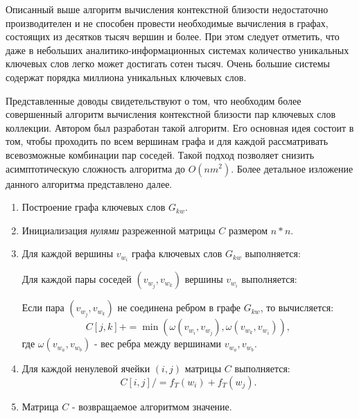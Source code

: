 Описанный выше алгоритм вычисления контекстной близости недостаточно производителен и не способен провести необходимые вычисления в графах, состоящих из десятков тысяч вершин и более. При этом следует отметить, что даже в небольших аналитико-информационных системах количество уникальных ключевых слов легко может достигать сотен тысяч. Очень большие системы содержат порядка миллиона уникальных ключевых слов.

Представленные доводы свидетельствуют о том, что необходим более совершенный алгоритм вычисления контекстной близости пар ключевых слов коллекции. Автором был разработан такой алгоритм. Его основная идея состоит в том, чтобы проходить по всем вершинам графа и для каждой рассматривать всевозможные комбинации пар соседей. Такой подход позволяет снизить асимптотическую сложность алгоритма до $O(nm^2)$. Более детальное изложение данного алгоритма представлено далее.

\begin{enumerate}
    \item Построение графа ключевых слов $G_{kw}$.
    \item Инициализация \emph{нулями} разреженной матрицы $C$ размером $n * n$.
    \item Для каждой вершины $v_{w_i}$ графа ключевых слов $G_{kw}$ выполняется:

        \hspace{15pt} Для каждой пары соседей $(v_{w_j}, v_{w_k})$ вершины $v_{w_i}$ выполняется:

                \hspace{30pt} Если пара $(v_{w_j}, v_{w_k})$ не соединена ребром в графе $G_{kw}$, то вычисляется:
                $$ C[j, k] \mathrel{{+}{=}} \min(\omega(v_{w_i}, v_{w_j}), \omega(v_{w_k}, v_{w_i})),$$
                \hspace{30pt}где $\omega(v_{w_a}, v_{w_b})$ - вес ребра между вершинами $v_{w_a}, v_{w_b}$.
    \item Для каждой ненулевой ячейки $(i, j)$ матрицы $C$ выполняется:
                $$ C[i, j] \mathrel{{/}{=}} f_T(w_i) + f_T(w_j). $$
    \item Матрица $C$ - возвращаемое алгоритмом значение.
\end{enumerate}


